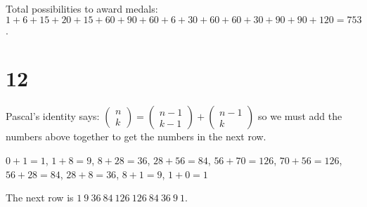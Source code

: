 \documentclass[12pt]{article}
\begin{document}
Total possibilities to award medals: $1 + 6 + 15 + 20 + 15 + 60 + 90 + 60 + 6 + 30 + 60 + 60 + 30 + 90 + 90 + 120 = 753$.

\section*{12}
Pascal's identity says: $\begin{pmatrix}
	n \\ k
\end{pmatrix}
= \begin{pmatrix}
	n - 1 \\ k - 1
\end{pmatrix}
+ \begin{pmatrix}
	n - 1 \\ k
\end{pmatrix}$ so we must add the numbers above together to get the numbers in the next row.

$0 + 1 = 1$, $1 + 8 = 9$, $8 + 28 = 36$, $28 + 56 = 84$, $56 + 70 = 126$, $70 + 56 = 126$, $56 + 28 = 84$, $28 + 8 = 36$, $8 + 1 = 9$, $1 + 0 = 1$

The next row is $1\ 9\ 36\ 84\ 126\ 126\ 84\ 36\ 9\ 1$.
\end{document}
